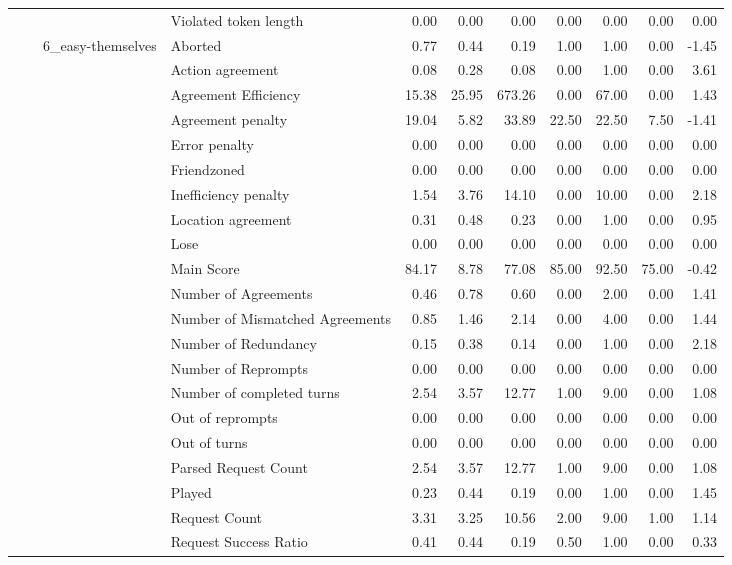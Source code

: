 \begin{tabular}{llllrrrrrrr}
 &  &  & Violated token length & 0.00 & 0.00 & 0.00 & 0.00 & 0.00 & 0.00 & 0.00 \\
\cline{3-11}
 &  & \multirow[t]{27}{*}{6_easy-themselves} & Aborted & 0.77 & 0.44 & 0.19 & 1.00 & 1.00 & 0.00 & -1.45 \\
 &  &  & Action agreement & 0.08 & 0.28 & 0.08 & 0.00 & 1.00 & 0.00 & 3.61 \\
 &  &  & Agreement Efficiency & 15.38 & 25.95 & 673.26 & 0.00 & 67.00 & 0.00 & 1.43 \\
 &  &  & Agreement penalty & 19.04 & 5.82 & 33.89 & 22.50 & 22.50 & 7.50 & -1.41 \\
 &  &  & Error penalty & 0.00 & 0.00 & 0.00 & 0.00 & 0.00 & 0.00 & 0.00 \\
 &  &  & Friendzoned & 0.00 & 0.00 & 0.00 & 0.00 & 0.00 & 0.00 & 0.00 \\
 &  &  & Inefficiency penalty & 1.54 & 3.76 & 14.10 & 0.00 & 10.00 & 0.00 & 2.18 \\
 &  &  & Location agreement & 0.31 & 0.48 & 0.23 & 0.00 & 1.00 & 0.00 & 0.95 \\
 &  &  & Lose & 0.00 & 0.00 & 0.00 & 0.00 & 0.00 & 0.00 & 0.00 \\
 &  &  & Main Score & 84.17 & 8.78 & 77.08 & 85.00 & 92.50 & 75.00 & -0.42 \\
 &  &  & Number of Agreements & 0.46 & 0.78 & 0.60 & 0.00 & 2.00 & 0.00 & 1.41 \\
 &  &  & Number of Mismatched Agreements & 0.85 & 1.46 & 2.14 & 0.00 & 4.00 & 0.00 & 1.44 \\
 &  &  & Number of Redundancy & 0.15 & 0.38 & 0.14 & 0.00 & 1.00 & 0.00 & 2.18 \\
 &  &  & Number of Reprompts & 0.00 & 0.00 & 0.00 & 0.00 & 0.00 & 0.00 & 0.00 \\
 &  &  & Number of completed turns & 2.54 & 3.57 & 12.77 & 1.00 & 9.00 & 0.00 & 1.08 \\
 &  &  & Out of reprompts & 0.00 & 0.00 & 0.00 & 0.00 & 0.00 & 0.00 & 0.00 \\
 &  &  & Out of turns & 0.00 & 0.00 & 0.00 & 0.00 & 0.00 & 0.00 & 0.00 \\
 &  &  & Parsed Request Count & 2.54 & 3.57 & 12.77 & 1.00 & 9.00 & 0.00 & 1.08 \\
 &  &  & Played & 0.23 & 0.44 & 0.19 & 0.00 & 1.00 & 0.00 & 1.45 \\
 &  &  & Request Count & 3.31 & 3.25 & 10.56 & 2.00 & 9.00 & 1.00 & 1.14 \\
 &  &  & Request Success Ratio & 0.41 & 0.44 & 0.19 & 0.50 & 1.00 & 0.00 & 0.33 \\

\end{tabular}
